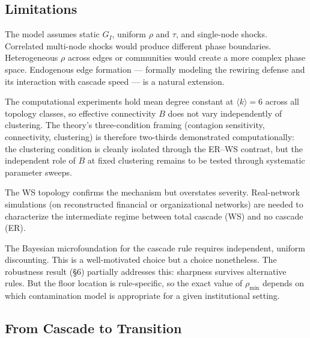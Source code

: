 \documentclass[11pt,a4paper]{article}
\begin{document}
\subsection{Limitations}

The model assumes static $G_I$, uniform $\rho$ and $\tau$, and single-node shocks. Correlated multi-node shocks would produce different phase boundaries. Heterogeneous $\rho$ across edges or communities would create a more complex phase space. Endogenous edge formation --- formally modeling the rewiring defense and its interaction with cascade speed --- is a natural extension.

The computational experiments hold mean degree constant at $\langle k \rangle = 6$ across all topology classes, so effective connectivity $B$ does not vary independently of clustering. The theory's three-condition framing (contagion sensitivity, connectivity, clustering) is therefore two-thirds demonstrated computationally: the clustering condition is cleanly isolated through the ER--WS contrast, but the independent role of $B$ at fixed clustering remains to be tested through systematic parameter sweeps.

The WS topology confirms the mechanism but overstates severity. Real-network simulations (on reconstructed financial or organizational networks) are needed to characterize the intermediate regime between total cascade (WS) and no cascade (ER).

The Bayesian microfoundation for the cascade rule requires independent, uniform discounting. This is a well-motivated choice but a choice nonetheless. The robustness result (\S6) partially addresses this: sharpness survives alternative rules. But the floor location is rule-specific, so the exact value of $\rho_{\min}$ depends on which contamination model is appropriate for a given institutional setting.

\subsection{From Cascade to Transition}
\end{document}
